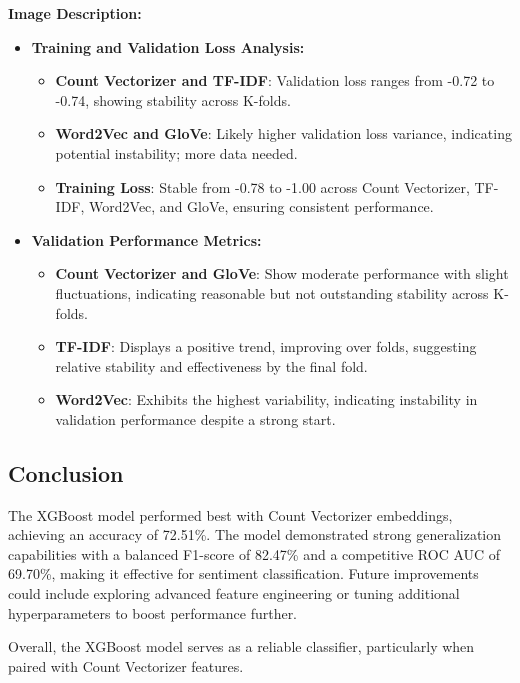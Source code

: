 \textbf{Image Description:}

\begin{itemize}
    \item \textbf{Training and Validation Loss Analysis:}
    \begin{itemize}
        \item \textbf{Count Vectorizer and TF-IDF}: Validation loss ranges from -0.72 to -0.74, showing stability across K-folds.
        \item \textbf{Word2Vec and GloVe}: Likely higher validation loss variance, indicating potential instability; more data needed.
        \item \textbf{Training Loss}: Stable from -0.78 to -1.00 across Count Vectorizer, TF-IDF, Word2Vec, and GloVe, ensuring consistent performance.
    \end{itemize}
    
    \item \textbf{Validation Performance Metrics:}
    \begin{itemize}
        \item \textbf{Count Vectorizer and GloVe}: Show moderate performance with slight fluctuations, indicating reasonable but not outstanding stability across K-folds.
        \item \textbf{TF-IDF}: Displays a positive trend, improving over folds, suggesting relative stability and effectiveness by the final fold.
        \item \textbf{Word2Vec}: Exhibits the highest variability, indicating instability in validation performance despite a strong start.
    \end{itemize}
\end{itemize}

\subsection{Conclusion}

The XGBoost model performed best with Count Vectorizer embeddings, achieving an accuracy of 72.51\%. The model demonstrated strong generalization capabilities with a balanced F1-score of 82.47\% and a competitive ROC AUC of 69.70\%, making it effective for sentiment classification. Future improvements could include exploring advanced feature engineering or tuning additional hyperparameters to boost performance further.

Overall, the XGBoost model serves as a reliable classifier, particularly when paired with Count Vectorizer features.

